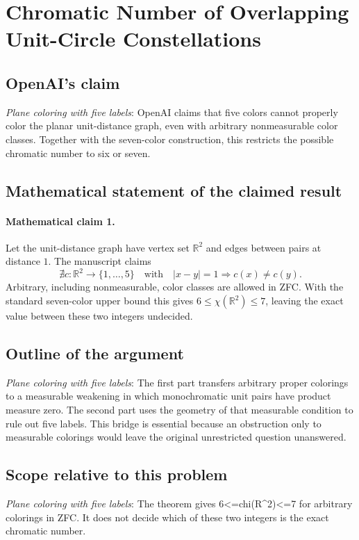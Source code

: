 \documentclass[11pt]{article}
\begin{document}
\section*{Chromatic Number of Overlapping Unit-Circle Constellations}

\subsection{OpenAI's claim}
\textit{Plane coloring with five labels}: OpenAI claims that five colors cannot properly color the planar unit-distance graph, even with arbitrary nonmeasurable color classes. Together with the seven-color construction, this restricts the possible chromatic number to six or seven.

\subsection{Mathematical statement of the claimed result}
\paragraph{Mathematical claim 1.} Let the unit-distance graph have vertex set $\mathbb R^2$ and edges between pairs at distance $1$. The manuscript claims \[\nexists c:\mathbb R^2\to\{1,\ldots,5\}\quad\text{with}\quad|x-y|=1\Longrightarrow c(x)\ne c(y).\] Arbitrary, including nonmeasurable, color classes are allowed in ZFC. With the standard seven-color upper bound this gives $6\le\chi(\mathbb R^2)\le7$, leaving the exact value between these two integers undecided.

\subsection{Outline of the argument}
\textit{Plane coloring with five labels}: The first part transfers arbitrary proper colorings to a measurable weakening in which monochromatic unit pairs have product measure zero. The second part uses the geometry of that measurable condition to rule out five labels. This bridge is essential because an obstruction only to measurable colorings would leave the original unrestricted question unanswered.

\subsection{Scope relative to this problem}
\textit{Plane coloring with five labels}: The theorem gives 6<=chi(R\textasciicircum{}2)<=7 for arbitrary colorings in ZFC. It does not decide which of these two integers is the exact chromatic number.
\end{document}
